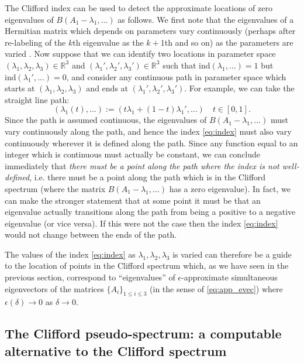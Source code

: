\documentclass[a4paper]{article}
\begin{document}
The Clifford index can be used to detect the approximate locations of zero eigenvalues of $B(A_1 - \lambda_1,...)$ as follows. We first note that the eigenvalues of a Hermitian matrix which depends on parameters vary continuously (perhaps after re-labeling of the $k$th eigenvalue as the $k+1$th and so on) as the parameters are varied \cite{Kato}. Now suppose that we can identify two locations in parameter space $(\lambda_1,\lambda_2,\lambda_3) \in \mathbb{R}^3$ and $(\lambda_1',\lambda_2',\lambda_3') \in \mathbb{R}^3$ such that $\text{ind}(\lambda_1,...) = 1$ but $\text{ind}(\lambda_1',...) = 0$, and consider any continuous path in parameter space which starts at $(\lambda_1,\lambda_2,\lambda_3)$ and ends at $(\lambda_1',\lambda_2',\lambda_3')$. For example, we can take the straight line path:
\begin{equation}
	\left(\lambda_1(t),...\right) := \left(t \lambda_1 + (1 - t) \lambda_1',...\right) \quad t \in [0,1].
\end{equation}
Since the path is assumed continuous, the eigenvalues of $B(A_1 - \lambda_1,...)$ must vary continuously along the path, and hence the index \eqref{eq:index} must also vary continuously wherever it is defined along the path. Since any function equal to an integer which is continuous must actually be constant, we can conclude immediately that \emph{there must be a point along the path where the index is not well-defined}, i.e. there must be a point along the path which is in the Clifford spectrum (where the matrix $B(A_1 - \lambda_1,...)$ has a zero eigenvalue). In fact, we can make the stronger statement that at some point it must be that an eigenvalue actually transitions along the path from being a positive to a negative eigenvalue (or vice versa). If this were not the case then the index \eqref{eq:index} would not change between the ends of the path. 

The values of the index \eqref{eq:index} as $\lambda_1, \lambda_2, \lambda_3$ is varied can therefore be a guide to the location of points in the Clifford spectrum which, as we have seen in the previous section, correspond to ``eigenvalues'' of $\epsilon$-approximate simultaneous eigenvectors of the matrices $\{ A_i \}_{1 \leq i \leq 3}$ (in the sense of \eqref{eq:app_evec}) where $\epsilon(\delta) \rightarrow 0$ as $\delta \rightarrow 0$.

\subsection{The Clifford pseudo-spectrum: a computable alternative to the Clifford spectrum}
\end{document}
